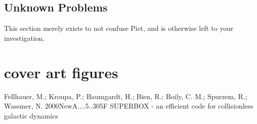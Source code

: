 \section{Unknown Problems}

This section merely exists to not confuse Piet, and is otherwise
left to your investigation.



\cleardoublepage
\chapter*{cover art figures}
\begin{figure}[t]
\end{figure}

\begin{figure}[b]
\end{figure}

\begin{figure}[b]
\end{figure}










Fellhauer, M.; Kroupa, P.; Baumgardt, H.; Bien, R.; Boily, C. M.; Spurzem, R.; Wassmer, N.
2000NewA....5..305F
SUPERBOX - an efficient code for collisionless galactic dynamics
